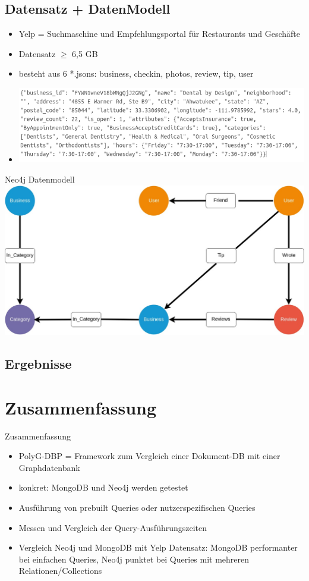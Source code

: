 \documentclass[12pt,usenames,dvipsnames]{beamer}
\begin{document}
\subsection{Datensatz + DatenModell}
\begin{frame}
\begin{itemize}[<+- | alert@+>]
\item Yelp = Suchmaschine und Empfehlungsportal für Restaurants und Geschäfte 
\item Datensatz $\geq$ 6,5 GB
\item besteht aus 6 *.jsons: business, checkin, photos, review, tip,  user
\item \includegraphics[width=1.0\textwidth]{business}
\end{itemize}
\end{frame}
\begin{frame}{Neo4j Datenmodell}
\includegraphics[width=1\textwidth]{neo4jModell}

\end{frame}
\subsection{Ergebnisse}
	\section{Zusammenfassung}
	\begin{frame}{Zusammenfassung}
	\begin{itemize}[<+- | alert@+>]
	\item PolyG-DBP = Framework zum Vergleich einer Dokument-DB mit einer Graphdatenbank
	\item konkret: MongoDB und Neo4j werden getestet
	\item Ausführung von prebuilt Queries oder nutzerspezifischen Queries
	\item Messen und Vergleich der Query-Ausführungszeiten
	\item Vergleich Neo4j und MongoDB mit Yelp Datensatz: MongoDB performanter bei einfachen Queries, Neo4j punktet bei Queries mit mehreren Relationen/Collections
	\end{itemize}
	\end{frame}
\end{document}
